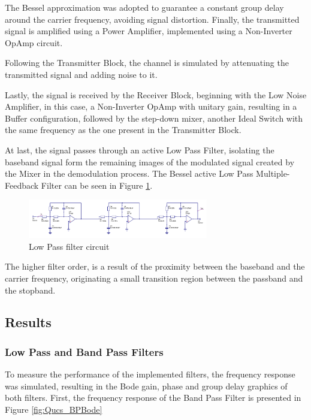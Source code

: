 The Bessel approximation was adopted to guarantee a constant group delay around the carrier frequency, avoiding signal distortion. Finally, the transmitted signal is amplified using a Power Amplifier, implemented using a Non-Inverter OpAmp circuit.

Following the Transmitter Block, the channel is simulated by attenuating the transmitted signal and adding noise to it. 

Lastly, the signal is received by the Receiver Block, beginning with the Low Noise Amplifier, in this case, a Non-Inverter OpAmp with unitary gain, resulting in a Buffer configuration, followed by the step-down mixer, another Ideal Switch with the same frequency as the one present in the Transmitter Block. 

At last, the signal passes through an active Low Pass Filter, isolating the baseband signal form the remaining images of the modulated signal created by the Mixer in the demodulation process. The Bessel active Low Pass Multiple-Feedback Filter can be seen in Figure \ref{fig:Qucs_LPcircuit}.

\begin{figure}[H]
    \centering
    \includegraphics*[width=0.7\textwidth]{Images/Qucs_LPcircuit.png}
    \caption{Low Pass filter circuit}
    \label{fig:Qucs_LPcircuit}
\end{figure}

The higher filter order, is a result of the proximity between the baseband and the carrier frequency, originating a small transition region between the passband and the stopband. 

\subsection{Results}

\subsubsection{Low Pass and Band Pass Filters}

To measure the performance of the implemented filters, the frequency response was simulated, resulting in the Bode gain, phase and group delay graphics of both filters. First, the frequency response of the Band Pass Filter is presented in Figure \ref{fig:Qucs_BPBode}

